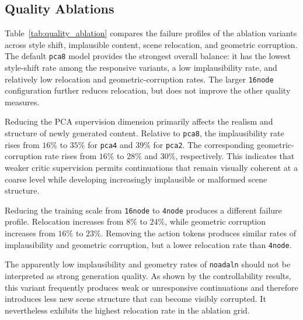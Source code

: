 \documentclass[letterpaper]{article} %
\begin{document}

\subsection{Quality Ablations}
\label{app:quality_ablations}

Table~\ref{tab:quality_ablation} compares the failure profiles of the
ablation variants across style shift, implausible content, scene relocation,
and geometric corruption. The default \texttt{pca8} model provides the
strongest overall balance: it has the lowest style-shift rate among the
responsive variants, a low implausibility rate, and relatively low relocation
and geometric-corruption rates. The larger \texttt{16node} configuration
further reduces relocation, but does not improve the other quality measures.

Reducing the PCA supervision dimension primarily affects the realism and
structure of newly generated content. Relative to \texttt{pca8}, the
implausibility rate rises from $16\%$ to $35\%$ for \texttt{pca4} and
$39\%$ for \texttt{pca2}. The corresponding geometric-corruption rate rises
from $16\%$ to $28\%$ and $30\%$, respectively. This indicates that weaker
critic supervision permits continuations that remain visually coherent at a
coarse level while developing increasingly implausible or malformed scene
structure.

Reducing the training scale from \texttt{16node} to \texttt{4node} produces
a different failure profile. Relocation increases from $8\%$ to $24\%$, while
geometric corruption increases from $16\%$ to $23\%$. Removing the action
tokens produces similar rates of implausibility and geometric corruption, but
a lower relocation rate than \texttt{4node}.

The apparently low implausibility and geometry rates of \texttt{noadaln}
should not be interpreted as strong generation quality. As shown by the
controllability results, this variant frequently produces weak or
unresponsive continuations and therefore introduces less new scene structure
that can become visibly corrupted. It nevertheless exhibits the highest
relocation rate in the ablation grid.
\end{document}
